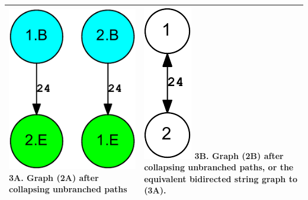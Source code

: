 \documentclass[letterpaper,12pt]{article}
\begin{document}
\begin{tabular}{|p{}|p{}|}
\tabularnewline \hline

\centering
\includegraphics[scale=0.6]{out.reduced.collapsed.digraph-crop.pdf}
\newline 3A. Graph (2A) after collapsing unbranched paths
&
\centering
\includegraphics[scale=0.7]{out.reduced.collapsed.bidigraph-crop.pdf}
\newline 3B. Graph (2B) after collapsing unbranched paths, or the equivalent
bidirected string graph to (3A).

\tabularnewline \hline

\end{tabular}
\newpage

\end{document}
